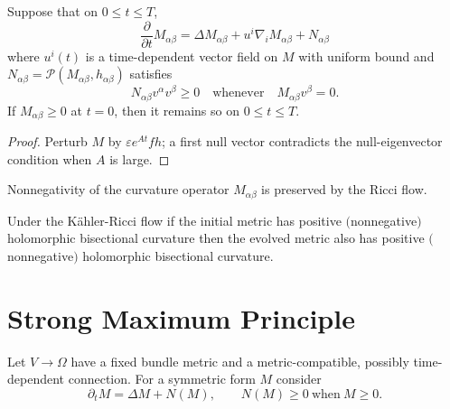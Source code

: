 \begin{lemma}
  \label{lem:cz-tensor-maximum-principle-on-complete-manifolds}
Suppose that on $0\le t\le T$,
$$
\frac{\partial}{\partial t}M_{\alpha\beta} =\Delta
M_{\alpha\beta}+u^i\nabla_i M_{\alpha\beta}+N_{\alpha\beta}
$$
where $u^i(t)$ is a time-dependent vector field on $M$ with
uniform bound and
$N_{\alpha\beta}={\mathcal{P}}(M_{\alpha\beta},h_{\alpha\beta})$
satisfies
$$
N_{\alpha\beta}v^\alpha v^\beta\ge 0 \quad \text{whenever} \quad
M_{\alpha\beta}v^\beta=0.
$$
If $M_{\alpha\beta}\ge 0$ at $t=0$, then it remains so on $0\le
t\le T$.
\end{lemma}

\begin{proof}
  \sketch Perturb $M$ by $\varepsilon e^{At}fh$; a first null vector contradicts the null-eigenvector condition when $A$ is large.
\end{proof}

\begin{proposition}
  \label{prop:cz-preservation-of-nonnegative-curvature-operator}
Nonnegativity of the curvature operator $M_{\alpha\beta}$ is
preserved by the Ricci flow.
\end{proposition}

\begin{proposition}
  \label{prop:cz-preservation-of-holomorphic-bisectional-curvature}
Under the K\"ahler-Ricci flow if the initial metric has positive
$($nonnegative$)$ holomorphic bisectional curvature then the
evolved metric also has positive $($nonnegative$)$ holomorphic
bisectional curvature.
\end{proposition}

\section{Strong Maximum Principle}

Let $V\to\Omega$ have a fixed bundle metric and a metric-compatible,
possibly time-dependent connection.  For a symmetric form $M$ consider
\[
\partial_tM=\Delta M+N(M), \qquad N(M)\ge0\ \text{when}\ M\ge0.
\tag{2.2.1}
\]

